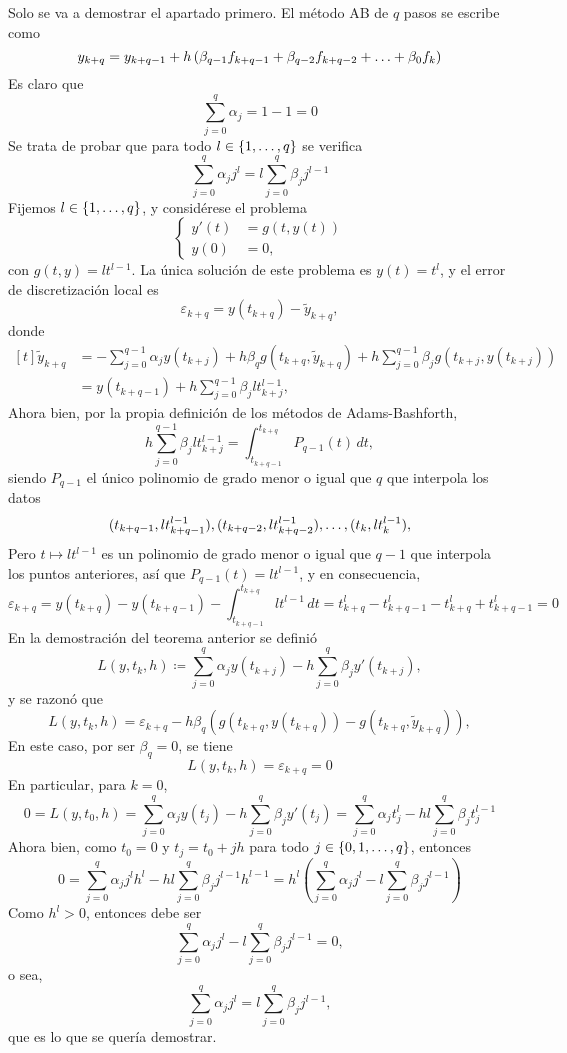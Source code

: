 \documentclass[11pt]{report}
\makeatletter
\renewenvironment{proof}[1][\proofname]{\par
  \pushQED{\qed}%
  \normalfont \topsep\z@skip %
  \trivlist
  \item[\hskip\labelsep
        \itshape
    #1\@addpunct{.}]\ignorespaces
}{%
  \popQED\endtrivlist\@endpefalse
}
\theoremstyle{mytheorem}
\theoremstyle{mydefinition}
\theoremstyle{myexample}
\let\oldproofname=\proofname
\renewcommand{\proofname}{\rm\bf{\oldproofname}}}
\makeatother
\begin{document}
\begin{proof}
Solo se va a demostrar el apartado primero. El método AB de $q$ pasos se escribe como
\[y_{k+q} = y_{k+q-1}+h\left({\beta}_{q-1}f_{k+q-1}+{\beta}_{q-2}f_{k+q-2}+\mathellipsis+{\beta}_0f_k\right)\]
Es claro que
\[\sum_{j=0}^q\alpha_j = 1-1 = 0\]
Se trata de probar que para todo $l \in \{1,\mathellipsis,q\}$ se verifica
\[\sum_{j=0}^q \alpha_j j^l = l \sum_{j=0}^q \beta_j j^{l-1}\]
Fijemos $l \in \{1,\mathellipsis,q\}$, y considérese el problema
\[\left\{\begin{alignedat}{1}
    y'(t) &= g(t,y(t))\\
    y(0) &= 0,
\end{alignedat}\right.\]
con $g(t,y) = lt^{l-1}$. La única solución de este problema es $y(t) = t^l$, y el error de discretización local es
\[\varepsilon_{k+q} = y(t_{k+q})-\widetilde{y}_{k+q},\]
donde
\[\begin{aligned}[t]
    \widetilde{y}_{k+q} &=-\sum_{j=0}^{q-1}\alpha_jy(t_{k+j}) + h\beta_qg(t_{k+q},\widetilde{y}_{k+q})+h\sum_{j=0}^{q-1}\beta_jg(t_{k+j},y(t_{k+j})) \\
    &=y(t_{k+q-1})+h\sum_{j=0}^{q-1}\beta_jlt_{k+j}^{l-1},
\end{aligned}\]
Ahora bien, por la propia definición de los métodos de Adams-Bashforth,
\[h\sum_{j=0}^{q-1}\beta_jlt_{k+j}^{l-1} = \int_{t_{k+q-1}}^{t_{k+q}}P_{q-1}(t) \, dt,\]
siendo $P_{q-1}$ el único polinomio de grado menor o igual que $q$ que interpola los datos
\[(t_{k+q-1}, lt_{k+q-1}^{l-1}),(t_{k+q-2},lt_{k+q-2}^{l-1}),\mathellipsis,(t_k,lt_{k}^{l-1}),\]
Pero $t \mapsto lt^{l-1}$ es un polinomio de grado menor o igual que $q-1$ que interpola los puntos anteriores, así que $P_{q-1}(t) = lt^{l-1}$, y en consecuencia,
\[\varepsilon_{k+q} =y(t_{k+q})- y(t_{k+q-1})-\int_{t_{k+q-1}}^{t_{k+q}}lt^{l-1}\, dt =t_{k+q}^l -t_{k+q-1}^l-t_{k+q}^l+t_{k+q-1}^l = 0\]
En la demostración del teorema anterior se definió
\[L(y,t_k,h)\coloneqq \sum_{j=0}^{q}\alpha_jy(t_{k+j})-h\sum_{j=0}^{q}\beta_jy'(t_{k+j}),\]
y se razonó que
\[L(y,t_k,h) = \varepsilon_{k+q}-h\beta_q\left(g(t_{k+q},y(t_{k+q}))-g(t_{k+q},\widetilde{y}_{k+q})\right),\]
En este caso, por ser $\beta_q = 0$, se tiene 
\[L(y,t_k,h) = \varepsilon_{k+q} = 0\]
En particular, para $k = 0$,
\[0 = L(y,t_0,h) = \sum_{j=0}^q\alpha_jy(t_j)-h\sum_{j=0}^q\beta_jy'(t_j)=\sum_{j=0}^q \alpha_jt_j^l-hl\sum_{j=0}^q \beta_jt_j^{l-1}\]
Ahora bien, como $t_0=0$ y $t_j = t_0+jh$ para todo $j \in \{0,1,\mathellipsis,q\}$, entonces
\[0 = \sum_{j=0}^q \alpha_jj^lh^l-hl\sum_{j=0}^q\beta_jj^{l-1}h^{l-1} = h^l \left(\sum_{j=0}^q\alpha_jj^l-l\sum_{j=0}^q\beta_jj^{l-1}\right)\]
Como $h^l>0$, entonces debe ser
\[\sum_{j=0}^q\alpha_jj^l-l\sum_{j=0}^q\beta_jj^{l-1}=0,\]
o sea,
\[\sum_{j=0}^q\alpha_jj^l=l\sum_{j=0}^q\beta_jj^{l-1},\]
que es lo que se quería demostrar.
\end{proof}
\end{document}
